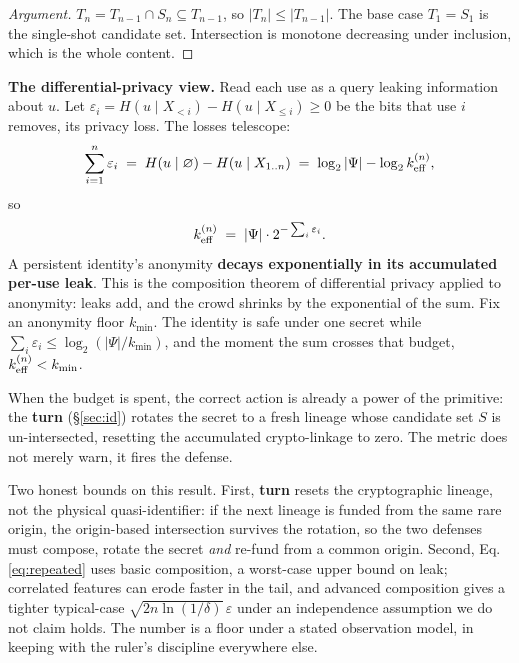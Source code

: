\documentclass[11pt]{article}
\begin{document}
\begin{proof}[Argument]
$T_n = T_{n-1} \cap S_n \subseteq T_{n-1}$, so $|T_n| \le |T_{n-1}|$. The base case
$T_1 = S_1$ is the single-shot candidate set. Intersection is monotone decreasing under
inclusion, which is the whole content.
\end{proof}

\textbf{The differential-privacy view.} Read each use as a query leaking information
about $u$. Let $\varepsilon_i = H(u \mid X_{<i}) - H(u \mid X_{\le i}) \ge 0$ be the bits
that use $i$ removes, its privacy loss. The losses telescope:
\[ \sum_{i=1}^{n} \varepsilon_i \;=\; H(u \mid \varnothing) - H(u \mid X_{1..n})
\;=\; \log_2 |\Psi| - \log_2 k_{\mathrm{eff}}^{(n)}, \]
so
\begin{equation}
k_{\mathrm{eff}}^{(n)} \;=\; |\Psi|\cdot 2^{-\sum_i \varepsilon_i}.
\label{eq:repeated}
\end{equation}
A persistent identity's anonymity \textbf{decays exponentially in its accumulated
per-use leak}. This is the composition theorem of differential privacy \cite{dwork}
applied to anonymity: leaks add, and the crowd shrinks by the exponential of the sum.
Fix an anonymity floor $k_{\min}$. The identity is safe under one secret while
$\sum_i \varepsilon_i \le \log_2(|\Psi| / k_{\min})$, and the moment the sum crosses that
budget, $k_{\mathrm{eff}}^{(n)} < k_{\min}$.

\begin{claimx}
When the budget is spent, the correct action is already a power of the primitive: the
\textbf{turn} (\S\ref{sec:id}) rotates the secret to a fresh lineage whose candidate set
$S$ is un-intersected, resetting the accumulated crypto-linkage to zero. The metric does
not merely warn, it fires the defense.
\end{claimx}

\begin{honest}
Two honest bounds on this result. First, \textbf{turn} resets the cryptographic lineage,
not the physical quasi-identifier: if the next lineage is funded from the same rare
origin, the origin-based intersection survives the rotation, so the two defenses must
compose, rotate the secret \emph{and} re-fund from a common origin. Second, Eq.
\ref{eq:repeated} uses basic composition, a worst-case upper bound on leak; correlated
features can erode faster in the tail, and advanced composition gives a tighter
typical-case $\sqrt{2n\ln(1/\delta)}\,\varepsilon$ under an independence assumption we do
not claim holds. The number is a floor under a stated observation model, in keeping with
the ruler's discipline everywhere else.
\end{honest}
\end{document}
